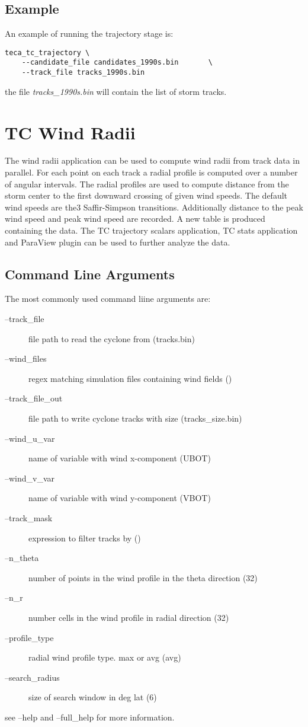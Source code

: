 \documentclass[a4paper,10pt,DIV=12]{scrreprt}
\begin{document}
\subsection{Example}
\noindent An example of running the trajectory stage is:
\begin{verbatim}
teca_tc_trajectory \
    --candidate_file candidates_1990s.bin       \
    --track_file tracks_1990s.bin
\end{verbatim}
the file \textit{tracks\_1990s.bin} will contain the list of storm tracks.

\section{TC Wind Radii}
The wind radii application can be used to compute wind radii from track data in parallel. For each point on each track a radial profile is computed over a number of angular intervals. The radial profiles are used to compute distance from the storm center to the first downward crossing of given wind speeds. The default wind speeds are the3 Saffir-Simpson transitions. Additionally distance to the peak wind speed and peak wind speed are recorded.  A new table is produced containing the data. The TC trajectory scalars application, TC stats application and ParaView plugin can be used to further analyze the data.

\subsection{Command Line Arguments}
The most commonly used command liine arguments are:
\begin{description}
\item[--track\_file] file path to read the cyclone from (tracks.bin)
\item[--wind\_files] regex matching simulation files containing wind fields ()
\item[--track\_file\_out] file path to write cyclone tracks with size (tracks\_size.bin)
\item[--wind\_u\_var] name of variable with wind x-component (UBOT)
\item[--wind\_v\_var] name of variable with wind y-component (VBOT)
\item[--track\_mask] expression to filter tracks by ()
\item[--n\_theta] number of points in the wind profile in the theta direction (32)
\item[--n\_r] number cells in the wind profile in radial direction (32)
\item[--profile\_type] radial wind profile type. max or avg (avg)
\item[--search\_radius] size of search window in deg lat (6)
\end{description}
see --help and --full\_help for more information.
\end{document}
